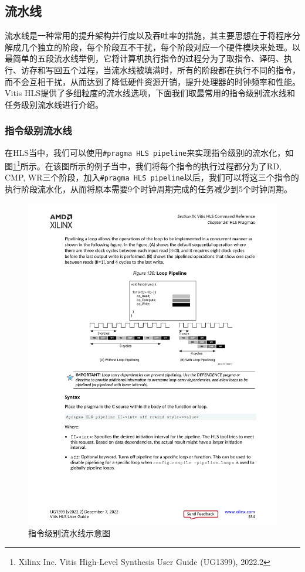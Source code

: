\subsection{流水线}

流水线是一种常用的提升架构并行度以及吞吐率的措施，其主要思想在于将程序分解成几个独立的阶段，每个阶段互不干扰，每个阶段对应一个硬件模块来处理。以最简单的五段流水线举例，它将计算机执行指令的过程分为了取指令、译码、执行、访存和写回五个过程，当流水线被填满时，所有的阶段都在执行不同的指令，而不会互相干扰，从而达到了降低硬件资源开销，提升处理器的时钟频率和性能。Vitis HLS提供了多细粒度的流水线选项，下面我们取最常用的指令级别流水线和任务级别流水线进行介绍。



\subsubsection{指令级别流水线}
在HLS当中，我们可以使用\verb|#pragma HLS pipeline|来实现指令级别的流水化，如图\ref{fig:pragma_pipeline}\footnote{Xilinx Inc. Vitis High-Level Synthesis User Guide (UG1399), 2022.2\label{ug1399}}所示。在该图所示的例子当中，我们将每个指令的执行过程都分为了RD, CMP, WR三个阶段，加入\verb|#pragma HLS pipeline|以后，我们可以将这三个指令的执行阶段流水化，从而将原本需要9个时钟周期完成的任务减少到5个时钟周期。

\begin{figure}[htbp]
    \centering
    \includegraphics[width=\linewidth]{figures/pragma_pipeline.pdf}
    \caption{指令级别流水线示意图}
    \label{fig:pragma_pipeline}
\end{figure}


